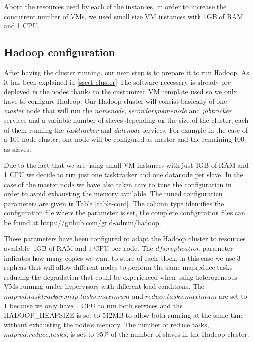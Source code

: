 \documentclass[oribibl]{llncs_Ibergrid2013}
\begin{document}
About the resources used by each of the instances, in order to increase the concurrent number of VMs, we used small size VM instances with 1GB of RAM and 1 CPU.


\subsection{Hadoop configuration}
\label{ssect-hadoop}
After having the cluster running, our next step is to prepare it to run Hadoop. As it has been explained in \ref{ssect-cluster} The software necessary is already pre-deployed in the nodes thanks to the customized VM template used so we only have to configure Hadoop. Our Hadoop cluster will consist basically of one \emph{master} node that will run the \emph{namenode}, \emph{secondarynamenode} and \emph{jobtracker} services and a variable number of slaves depending on the size of the cluster, each of them running the \emph{tasktracker} and \emph{datanode} services. For example in the case of a 101 node cluster, one node will be configured as master and the remaining 100 as slaves. 




Due to the fact that we are using small VM instances with just 1GB of RAM and 1 CPU we decide to run just one tasktracker and one datanode per slave. In the case of the master node we have also taken care to tune the configuration in order to avoid exhausting the memory available. The tuned configuration parameters are given in Table \ref{table-cont}. The column type identifies the configuration file where the parameter is set, the complete configuration files can be found at \url{https://github.com/grid-admin/hadoop}.

These parameters have been configured to adapt the Hadoop cluster to resources available--1GB of RAM and 1 CPU per node. The $dfs.replication$ parameter indicates how many copies we want to store of each block, in this case we use 3 replicas that will allow different nodes to perform the same mapreduce tasks reducing the degradation that could be experienced when using heterogeneous VMs running under hypervisors with different load conditions. The $mapred.tasktracker.map.tasks.maximum$ and $reduce.tasks.maximum$ are set to 1 because we only have 1 CPU to run both services and the HADOOP\_HEAPSIZE is set to 512MB to allow both running at the same time without exhausting the node's memory. The number of reduce tasks, $mapred.reduce.tasks$, is set to 95\% of the number of slaves in the Hadoop cluster. 
\end{document}
